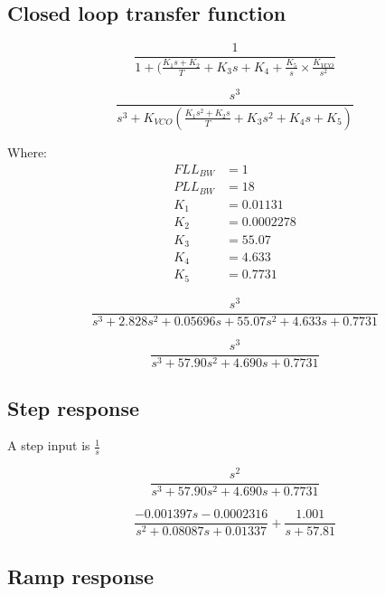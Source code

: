 \subsection{Closed loop transfer function}

\begin{comment}
PLL/FLL s^2 Ratio = 19.4
PLL/FLL s Ratio = 81.3339
\end{comment}

\begin{equation}
\frac{1}{1+(\frac{K_1 s + K_2}{T} + K_3  s +K_4  + \frac{K_5}{s}  \times \frac{K_{VCO}}{s^2}}
\end{equation}


\begin{equation}
\frac{s^3}{s^3 + K_{VCO}(\frac{K_1 s^2 + K_2 s}{T} + K_3 s^2 + K_4 s + K_5)}
\end{equation}

Where:
\begin{align*}
FLL_{BW}&=1\\
PLL_{BW}&=18\\
K_1 &=  0.01131\\
K_2 &=  0.0002278\\
K_3 &= 55.07\\
K_4 &= 4.633\\
K_5 &= 0.7731
\end{align*}

\begin{equation}
\frac{s^3}{s^3 +2.828 s^2 + 0.05696 s + 55.07 s^2 + 4.633 s + 0.7731}
\end{equation}

\begin{equation}
\frac{s^3}{s^3 +57.90 s^2 + 4.690 s +0.7731}
\end{equation}

\subsection{Step response}

A step input is $\frac{1}{s}$

\begin{equation}
\frac{s^2}{s^3 +57.90 s^2 + 4.690 s +0.7731}
\end{equation}

\begin{equation}
\frac{-0.001397 s - 0.0002316}{s^2 + 0.08087 s + 0.01337} + \frac{1.001}{s + 57.81}
\end{equation}

\subsection{Ramp response}

